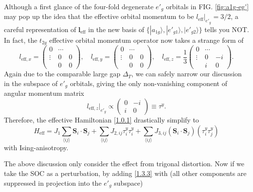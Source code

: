 \documentclass[10pt,nofootinbib,letterpaper]{revtex4}
\begin{document}
		Although a first glance of the four-fold degenerate $e'_g$ orbitals in FIG. \ref{fig:a1g-eg'} may pop up the idea that the effective orbital momentum to be $l_{\text{eff}}|_{e'_g}=3/2$, a careful representation of $\bm{l}_{\text{eff}}$ in the new basis of $\{|a_{1g}\rangle,|e'_{g1}\rangle,|e'_{g2}\rangle\}$ tells you NOT. In fact, the $t_{2g}$ effective orbital momentum operator now takes a strange form of
		\begin{equation}\label{1.3.1}
			l_{\text{eff},x}=\left(\begin{array}{c|cc}
				0 & \cdots &\\
				\hline
				\vdots & 0 & 0\\
				 & 0& 0
			\end{array}\right),\quad
			l_{\text{eff},y}=\left(\begin{array}{c|cc}
				0 & \cdots &\\
				\hline
				\vdots & 0 & 0\\
				 & 0& 0
			\end{array}\right),\quad
			l_{\text{eff},z}=\dfrac{1}{3}\left(\begin{array}{c|cc}
				0 & \cdots &\\
				\hline
				\vdots & 0 & -i\\
				 & i & 0
			\end{array}\right).
		\end{equation}
		Again due to the comparable large gap $\Delta_T$, we can safely narrow our discussion in the subspace of $e'_g$ orbitals, giving the only non-vanishing component of angular momentum matrix
		\begin{equation}\label{1.3.2}
			l_{\text{eff},z}|_{e'_g}\propto\left(\begin{array}{cc}
				0 &-i\\i & 0
			\end{array}\right)\equiv\tau^y.
		\end{equation}
		Therefore, the effective Hamiltonian \eqref{1.0.1} drastically simplify to
		\begin{equation}\label{1.3.3}
			H_{\text{eff}}=J_1\sum_{\langle ij \rangle}\bm{S}_i\cdot\bm{S}_j+\sum_{\langle ij \rangle}J_{2,ij}\tau_i^y\tau_i^y+\sum_{\langle ij \rangle }J_{3,ij}(\bm{S}_i\cdot\bm{S}_j)(\tau_i^y\tau_j^y)
		\end{equation}
		with Ising-anisotropy.\par
		The above discussion only consider the effect from trigonal distortion. Now if we take the SOC as a perturbation, by adding \eqref{1.3.3} with (all other components are suppressed in projection into the $e'_g$ subspace)
\end{document}

